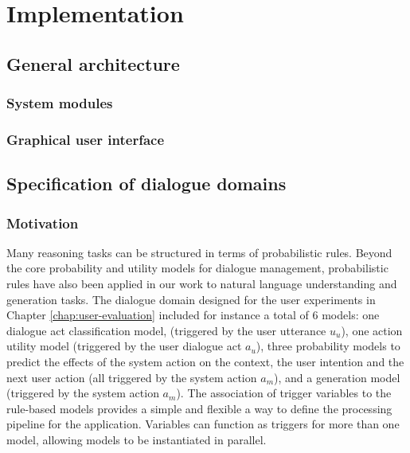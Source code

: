 \chapter{Implementation}
\label{chap:opendial}

\section{General architecture}


\subsection{System modules}


\subsection{Graphical user interface}

\section{Specification of dialogue domains}
\label{sec:domain-specification}



\subsection{Motivation}

Many reasoning tasks can be structured in terms of probabilistic rules.  Beyond the core probability and utility models for dialogue management, probabilistic rules have also been applied in our work to natural language understanding and generation tasks.  The dialogue domain designed for the user experiments in Chapter \ref{chap:user-evaluation} included for instance a total of 6 models: one dialogue act classification model, (triggered by the user utterance $u_u$), one action utility model (triggered by the user dialogue act $a_u$), three probability models to predict the effects of the system action on the context, the user intention and the next user action (all triggered by the system action $a_m$), and a generation model (triggered by the system action $a_m$).  The association of trigger variables to the rule-based models provides a simple and flexible a way to define the processing pipeline for the application.  Variables can function as triggers for more than one model, allowing models to be instantiated in parallel.



